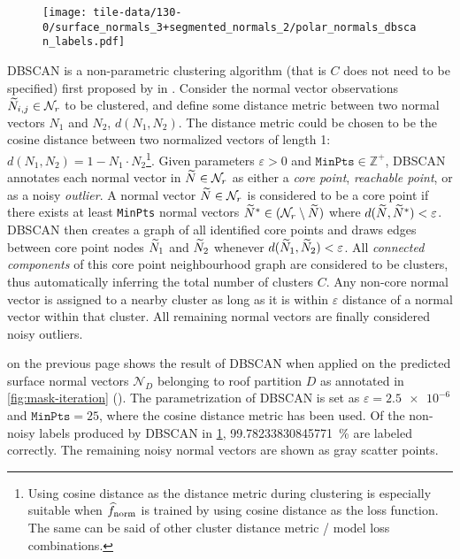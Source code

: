 \begin{wrapfigure}{r}{0.35\textwidth}
  \begin{center}
    \texttt{[image: tile-data/130-0/surface\_normals\_3+segmented\_normals\_2/polar\_normals\_dbscan\_labels.pdf]}
  \end{center}
  \label{fig:polar-normal-dbscan-labels}
\end{wrapfigure}
DBSCAN is a non-parametric clustering algorithm (that is $C$ does not need to be specified) first proposed by \citeauthor{dbscan} in \citeyear{dbscan}\cite{dbscan}.
Consider the normal vector observations $\widetilde{N}_{i,j} \in \mathcal{N}_r$ to be clustered, and define some distance metric between two normal vectors $N_1$ and $N_2$, $d(N_1, N_2)$.
The distance metric could be chosen to be the cosine distance between two normalized vectors of length 1: $d(N_1, N_2) = 1 - N_1 \cdot N_2$\footnote{Using cosine distance as the distance metric during clustering is especially suitable when $\widehat{f}_{\mathrm{norm}}$ is trained by using cosine distance as the loss function. The same can be said of other cluster distance metric / model loss combinations.}.
Given parameters $\varepsilon > 0$ and $\texttt{MinPts} \in \mathbb{Z}^+$, DBSCAN annotates each normal vector in $\widetilde{N} \in \mathcal{N}_r$ as either a \textit{core point}, \textit{reachable point}, or as a noisy \textit{outlier}.
A normal vector $\widetilde{N} \in \mathcal{N}_r$ is considered to be a core point if there exists at least \texttt{MinPts} normal vectors $\widetilde{N}^* \in (\mathcal{N}_{r} \setminus \widetilde{N})$ where $d(\widetilde{N}, \widetilde{N}^*) < \varepsilon$.
DBSCAN then creates a graph of all identified core points and draws edges between core point nodes $\widetilde{N}_1$ and $\widetilde{N}_2$ whenever $d(\widetilde{N}_1, \widetilde{N}_2) < \varepsilon$.
All \textit{connected components} of this core point neighbourhood graph are considered to be clusters, thus automatically inferring the total number of clusters $C$.
Any non-core normal vector is assigned to a nearby cluster as long as it is within $\varepsilon$ distance of a normal vector within that cluster.
All remaining normal vectors are finally considered noisy outliers.

 on the previous page shows the result of DBSCAN when applied on the predicted surface normal vectors $\mathcal{N}_D$ belonging to roof partition $D$ as annotated in \cref{fig:mask-iteration} ().
The parametrization of DBSCAN is set as $\varepsilon = \num{2.5e-6}$ and $\texttt{MinPts} = 25$, where the cosine distance metric has been used.
Of the non-noisy labels produced by DBSCAN in \cref{fig:polar-normal-dbscan-labels}, \SI[round-mode=places,round-precision=1]{99.78233830845771}{\percent} are labeled correctly.
The remaining noisy normal vectors are shown as gray scatter points.

